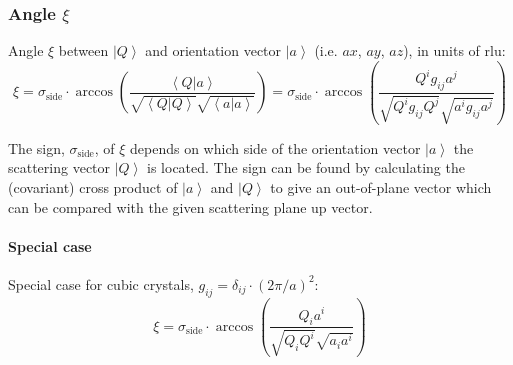 \subsubsection*{Angle $\xi$}
Angle $\xi$ between $\left| Q \right>$ and orientation vector $\left| a \right>$ (i.e. $ax$, $ay$, $az$), in units of rlu:
\begin{equation} \boxed{ \xi = 
\sigma_{\mathrm{side}} \cdot \arccos \left( \frac{ \left< Q | a \right> }{ \sqrt{\left< Q | Q \right>} \sqrt{\left< a | a \right>} } \right) = 
\sigma_{\mathrm{side}} \cdot \arccos \left( \frac{ Q^i g_{ij} a^j }{ \sqrt{Q^i g_{ij} Q^j} \sqrt{a^i g_{ij} a^j} } \right) } \end{equation}

The sign, $\sigma_{\mathrm{side}}$, of $\xi$ depends on which side of the orientation vector $\left| a \right>$ the scattering vector $\left| Q \right>$ 
is located. The sign can be found by calculating the (covariant) cross product of $\left| a \right>$ and $\left| Q \right>$ to give an out-of-plane vector 
which can be compared with the given scattering plane up vector.


\paragraph*{Special case}
Special case for cubic crystals, $g_{ij} = \delta_{ij} \cdot \left( 2\pi / a \right)^2$:
\begin{equation} \xi = \sigma_{\mathrm{side}} \cdot \arccos \left( \frac{ Q_i a^i }{ \sqrt{Q_i Q^i} \sqrt{a_i a^i} } \right) \end{equation}

